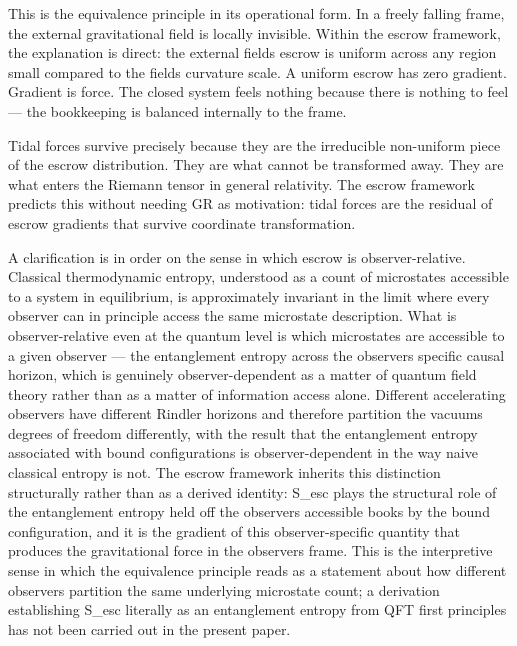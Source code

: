 \documentclass[11pt]{article}
\begin{document}
This is the equivalence principle in its operational form. In a freely falling frame, the external gravitational field is locally invisible. Within the escrow framework, the explanation is direct: the external field\textquotesingle s escrow is uniform across any region small compared to the field\textquotesingle s curvature scale. A uniform escrow has zero gradient. Gradient is force. The closed system feels nothing because there is nothing to feel --- the bookkeeping is balanced internally to the frame.

Tidal forces survive precisely because they are the irreducible non-uniform piece of the escrow distribution. They are what cannot be transformed away. They are what enters the Riemann tensor in general relativity. The escrow framework predicts this without needing GR as motivation: tidal forces are the residual of escrow gradients that survive coordinate transformation.

A clarification is in order on the sense in which escrow is observer-relative. Classical thermodynamic entropy, understood as a count of microstates accessible to a system in equilibrium, is approximately invariant in the limit where every observer can in principle access the same microstate description. What is observer-relative even at the quantum level is which microstates are accessible to a given observer --- the entanglement entropy across the observer\textquotesingle s specific causal horizon, which is genuinely observer-dependent as a matter of quantum field theory rather than as a matter of information access alone. Different accelerating observers have different Rindler horizons and therefore partition the vacuum\textquotesingle s degrees of freedom differently, with the result that the entanglement entropy associated with bound configurations is observer-dependent in the way naive classical entropy is not. The escrow framework inherits this distinction structurally rather than as a derived identity: S\_esc plays the structural role of the entanglement entropy held off the observer\textquotesingle s accessible books by the bound configuration, and it is the gradient of this observer-specific quantity that produces the gravitational force in the observer\textquotesingle s frame. This is the interpretive sense in which the equivalence principle reads as a statement about how different observers partition the same underlying microstate count; a derivation establishing S\_esc literally as an entanglement entropy from QFT first principles has not been carried out in the present paper.
\end{document}
